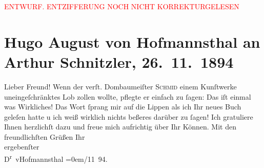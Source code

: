 
\begin{center}
            \textcolor{red}{ENTWURF. ENTZIFFERUNG NOCH NICHT KORREKTURGELESEN}
                      \end{center}
            
               \section[Hugo August von Hofmannsthal an Arthur Schnitzler, 26. 11. 1894]{ Hugo August von Hofmannsthal an Arthur Schnitzler,
                    26. 11. 1894}\nopagebreak{}\rehead{ }\begin{ledgroupsized}[t]{13cm}\normalsize\beginnumbering{} \toendnotes[C]{\smallbreak\pagebreak[2]} 
\toendnotes[C]{\smallbreak}\pstart{}{\pb}Lieber Freund!\pend\pstart
           Wenn der verſt. Dombaumeiſter \textsc{Schmid} einem Kunſtwerke uneingeſchränktes Lob zollen wollte, pflegte er einfach
                    zu ſagen: Das iſt einmal was Wirkliches! Das Wort ſprang mir auf die Lippen als
                    ich Ihr neues Buch geleſen
                    hatte u ich weiß wirklich nichts beßeres darüber zu ſagen! Ich gratuliere Ihnen
                    herzlichſt {\pb}dazu und freue mich aufrichtig über
                    Ihr Können.\pend
           \pstart
           Mit den freundlichſten Grüßen Ihr{\\[\baselineskip]}ergebenſter{\\[\baselineskip]}\spacefill\mbox{D\textsuperscript{r} vHofmannsthal}\pend
           \leftskip=0em{}/11 94.\pend
           \endnumbering{}\end{ledgroupsized}  \newcommand{\dateiname}{L00406}\newcommand{\titel}{Hugo August von Hofmannsthal an Arthur Schnitzler, 26. 11. 1894}\newcommand{\editorInnen}{Martin Anton Müller und Gerd-Hermann Susen}
      